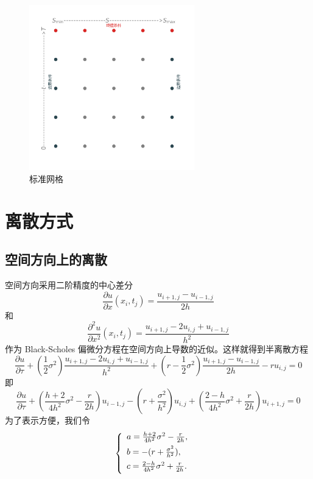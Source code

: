 \documentclass{article}
\begin{document}
\begin{figure}[H]
  \centering
  \includegraphics[width=0.64\textwidth,height=0.64\textwidth]{Images/1_grid.png}
  \caption{标准网格}
  \label{fig:1_grid}
\end{figure} 



\section{离散方式}


\subsection{空间方向上的离散}

空间方向采用二阶精度的中心差分
$$\frac{\partial u}{\partial x}(x_i, t_j) = \frac{u_{i+1, j} - u_{i-1, j}}{2h}$$
和
$$\frac{\partial^2 u}{\partial x^2}(x_i, t_j) = \frac{u_{i+1, j} - 2u_{i, j} + u_{i-1, j}}{h^2}$$
作为 Black-Scholes 偏微分方程在空间方向上导数的近似。这样就得到半离散方程
$$\frac{\partial u}{\partial \tau} + (\frac{1}{2}\sigma^2)\frac{u_{i+1, j} - 2u_{i, j} + u_{i-1, j}}{h^2} + (r - \frac{1}{2}\sigma^2)\frac{u_{i+1, j} - u_{i-1, j}}{2h} - ru_{i, j} = 0$$
即$$\frac{\partial u}{\partial \tau} + (\frac{h+2}{4h^2}\sigma^2 - \frac{r}{2h})u_{i-1, j} - (r + \frac{\sigma^2}{h^2})u_{i, j} + (\frac{2-h}{4h^2}\sigma^2 + \frac{r}{2h})u_{i+1, j} = 0$$
为了表示方便，我们令
\begin{equation}
\left\{
        \begin{array}{lr}
        \vspace{1ex}
        a = \frac{h+2}{4h^2}\sigma^2 - \frac{r}{2h}, & \\
        \vspace{1ex}
        b = -(r + \frac{\sigma^2}{h^2}), & \\
        \vspace{1ex}
        c = \frac{2-h}{4h^2}\sigma^2 + \frac{r}{2h}. &  
        \end{array}
\right.
\nonumber
\end{equation}
\end{document}
